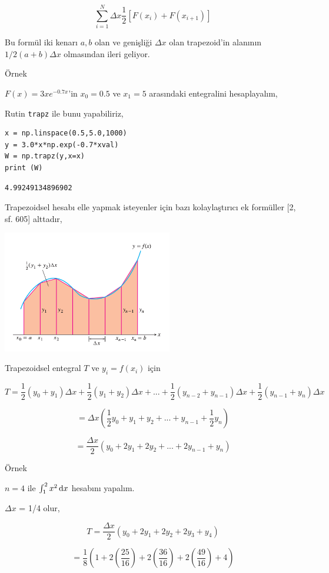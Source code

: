 \documentclass[12pt,fleqn]{article}\usepackage{../../common}
\begin{document}
$$
\sum _{i=1}^{N} \Delta x \frac{1}{2} [F(x_i) + F(x_{i+1})]
$$

Bu formül iki kenarı $a,b$ olan ve genişliği $\Delta x$ olan trapezoid'in
alanının $1/2(a+b)\Delta x$ olmasından ileri geliyor.

Örnek

$F(x) = 3 x e^{-0.7 x}$'in $x_0=0.5$ ve $x_1=5$ arasındaki entegralini
hesaplayalım,

Rutin \verb!trapz! ile bunu yapabiliriz,

\begin{verbatim}
x = np.linspace(0.5,5.0,1000)
y = 3.0*x*np.exp(-0.7*xval)
W = np.trapz(y,x=x)
print (W)
\end{verbatim}

\begin{verbatim}
4.99249134896902
\end{verbatim}

Trapezoidsel hesabı elle yapmak isteyenler için bazı kolaylaştırıcı ek
formüller [2, sf. 605] alttadır,

\includegraphics[width=20em]{compscieng_app01numint_02.png}

Trapezoidsel entegral $T$ ve $y_i = f(x_i)$ için 

$$
T = \frac{1}{2} (y_0 + y_1)\Delta x + \frac{1}{2} (y_1 + y_2)\Delta x +... +
\frac{1}{2} (y_{n-2} + y_{n-1})\Delta x + \frac{1}{2} (y_{n-1} + y_n)\Delta x
$$

$$
= \Delta x (\frac{1}{2}y_0 + y_1 + y_2 + ... + y_{n-1} + \frac{1}{2} y_n )
$$

$$
= \frac{\Delta x}{2} (y_0 + 2y_1 + 2y_2 + ... + 2y_{n-1} + y_n)
$$

Örnek

$n=4$ ile  $\int_{1}^{2} x^2 \,\mathrm{d} x$ hesabını yapalım. 

$\Delta x$ = 1/4 olur,

$$
T = \frac{\Delta x}{2} (y_0 + 2y_1 + 2y_2 + 2y_3 + y_4)
$$

$$
= \frac{1}{8} (1 + 2 (\frac{25}{16}) + 2(\frac{36}{16}) + 2 (\frac{49}{16}) + 4)
$$
\end{document}
